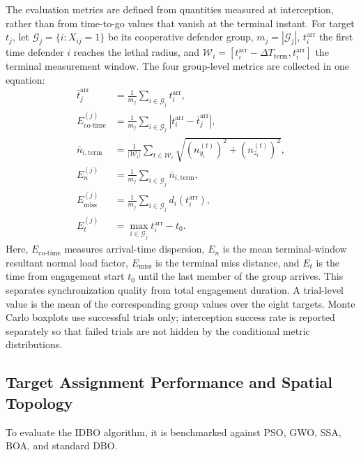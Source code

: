 \documentclass[lettersize,journal]{IEEEtran}
\begin{document}
The evaluation metrics are defined from quantities measured at interception, rather than from
time-to-go values that vanish at the terminal instant. For target $t_j$, let
$\mathcal G_j=\{i:X_{ij}=1\}$ be its cooperative defender group,
$m_j=|\mathcal G_j|$, $t_i^{\mathrm{arr}}$ the first time defender $i$ reaches the lethal
radius, and $\mathcal W_i=[t_i^{\mathrm{arr}}-\Delta T_{\mathrm{term}},
t_i^{\mathrm{arr}}]$ the terminal measurement window. The four group-level metrics are
collected in one equation:
\begin{equation}
\label{eq:evaluation_metrics}
\begin{aligned}
\bar t_j^{\mathrm{arr}}
 &=\frac{1}{m_j}\sum_{i\in\mathcal G_j}t_i^{\mathrm{arr}},\\
E_{\mathrm{co\text{-}time}}^{(j)}
 &=\frac{1}{m_j}\sum_{i\in\mathcal G_j}
 \left|t_i^{\mathrm{arr}}-\bar t_j^{\mathrm{arr}}\right|,\\
\bar n_{i,\mathrm{term}}
 &=\frac{1}{|\mathcal W_i|}\sum_{t\in\mathcal W_i}
 \sqrt{(n_{y_i}^{(t)})^2+(n_{z_i}^{(t)})^2},\\
E_n^{(j)}
 &=\frac{1}{m_j}\sum_{i\in\mathcal G_j}
 \bar n_{i,\mathrm{term}},\\
E_{\mathrm{miss}}^{(j)}
 &=\frac{1}{m_j}\sum_{i\in\mathcal G_j}d_i(t_i^{\mathrm{arr}}),\\
E_t^{(j)}&=\max_{i\in\mathcal G_j}t_i^{\mathrm{arr}}-t_0.
\end{aligned}
\end{equation}
Here, $E_{\mathrm{co\text{-}time}}$ measures arrival-time dispersion,
$E_n$ is the mean terminal-window resultant normal load factor, $E_{\mathrm{miss}}$ is the terminal miss
distance, and $E_t$ is the time from engagement start $t_0$ until the last member of the group
arrives. This separates synchronization quality from total engagement duration. A trial-level
value is the mean of the corresponding group values over the eight targets. Monte Carlo
boxplots use successful trials only; interception success rate is reported separately so that
failed trials are not hidden by the conditional metric distributions.
 
\subsection{Target Assignment Performance and Spatial Topology}
\label{subsec:assignment_results}

To evaluate the IDBO algorithm, it is benchmarked against PSO, GWO, SSA, BOA, and standard DBO. 
\end{document}
